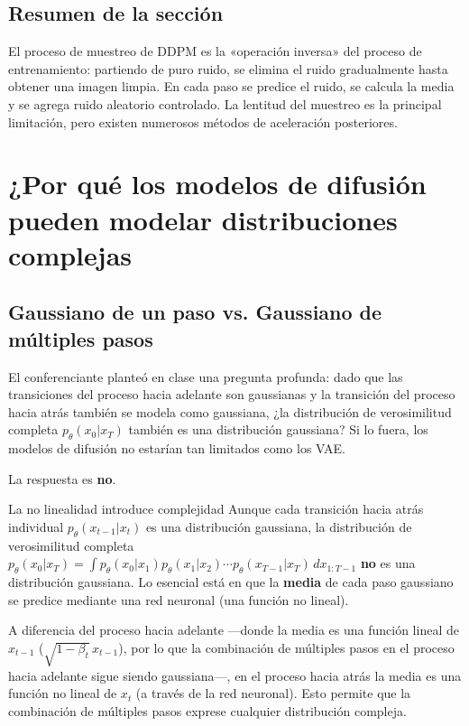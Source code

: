 \documentclass[a4paper]{article}
\begin{document}
\subsection{Resumen de la sección}

El proceso de muestreo de DDPM es la «operación inversa» del proceso de entrenamiento: partiendo de puro ruido, se elimina el ruido gradualmente hasta obtener una imagen limpia. En cada paso se predice el ruido, se calcula la media y se agrega ruido aleatorio controlado. La lentitud del muestreo es la principal limitación, pero existen numerosos métodos de aceleración posteriores.

\section{¿Por qué los modelos de difusión pueden modelar distribuciones complejas}

\subsection{Gaussiano de un paso vs. Gaussiano de múltiples pasos}

El conferenciante planteó en clase una pregunta profunda: dado que las transiciones del proceso hacia adelante son gaussianas y la transición del proceso hacia atrás también se modela como gaussiana, ¿la distribución de verosimilitud completa $p_\theta(x_0|x_T)$ también es una distribución gaussiana? Si lo fuera, los modelos de difusión no estarían tan limitados como los VAE.

La respuesta es \textbf{no}.

\begin{importantbox}{La no linealidad introduce complejidad}
Aunque cada transición hacia atrás individual $p_\theta(x_{t-1}|x_t)$ es una distribución gaussiana, la distribución de verosimilitud completa $p_\theta(x_0|x_T) = \int p_\theta(x_0|x_1) p_\theta(x_1|x_2) \cdots p_\theta(x_{T-1}|x_T) \, dx_{1:T-1}$ \textbf{no} es una distribución gaussiana. Lo esencial está en que la \textbf{media} de cada paso gaussiano se predice mediante una red neuronal (una función no lineal).

A diferencia del proceso hacia adelante —donde la media es una función lineal de $x_{t-1}$ ($\sqrt{1-\beta_t}\, x_{t-1}$), por lo que la combinación de múltiples pasos en el proceso hacia adelante sigue siendo gaussiana—, en el proceso hacia atrás la media es una función no lineal de $x_t$ (a través de la red neuronal). Esto permite que la combinación de múltiples pasos exprese cualquier distribución compleja.
\end{importantbox}
\end{document}
